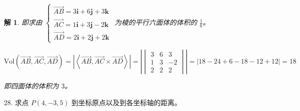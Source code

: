 \documentclass[a4paper,12pt]{article}
\newtheorem*{解}{解}
\begin{document}
\begin{解}
即求由 $\begin{cases}
        \overrightarrow{AB}=3\boldsymbol{i} + 6\boldsymbol{j} + 3\boldsymbol{k} \\
        \overrightarrow{AC}=1\boldsymbol{i} + 3\boldsymbol{j} - 2\boldsymbol{k} \\
        \overrightarrow{AD}=2\boldsymbol{i} + 2\boldsymbol{j} + 2\boldsymbol{k}
    \end{cases}$ 为棱的平行六面体的体积的 $\frac{1}{6}$。

$$\text{Vol}(\overrightarrow{AB},\overrightarrow{AC},\overrightarrow{AD})=\left|\left<\overrightarrow{AB},\overrightarrow{AC}\times \overrightarrow{AD}\right>\right|=\left|\begin{vmatrix}
        3 & 6 & 3  \\
        1 & 3 & -2 \\
        2 & 2 & 2
    \end{vmatrix}\right|=\left|18-24+6-18-12+12\right|=18$$

即四面体的体积为 $3$。
\end{解}

28. 求点 $P(4, -3, 5)$ 到坐标原点以及到各坐标轴的距离。
\end{document}

